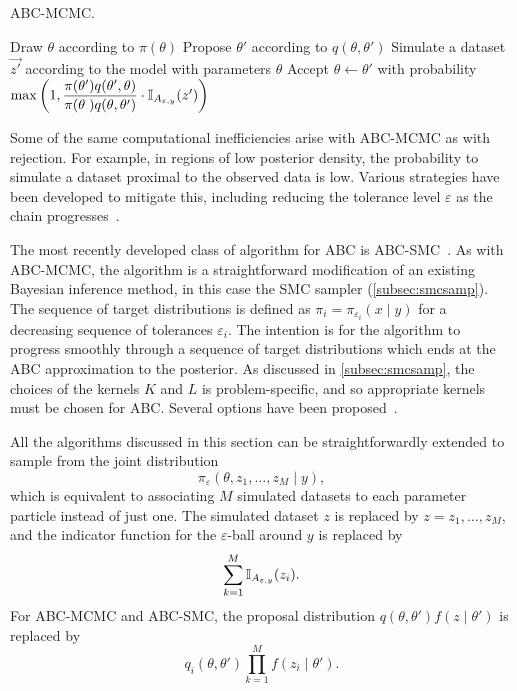 \begin{algorithm}
  \caption{\gls{ABC}-\gls{MCMC}.}
  \begin{algorithmic}
    \State Draw $\theta$ according to $\pi(\theta)$
    \Loop
      \State Propose $\theta'$ according to $q(\theta, \theta')$
      \State Simulate a dataset $\vec{z'}$ according to the model with
             parameters $\theta$
      \State Accept $\theta \gets \theta'$ with probability
      $\max \left( 1, 
       \dfrac{\pi(\theta') q(\theta', \theta)}
             {\pi(\theta\phantom{'}) q(\theta, \theta')} 
       \cdot \mathbb{I}_{A_{\varepsilon, y}}(z') \right)$
    \EndLoop
  \end{algorithmic}
  \label{alg:abcmcmc}
\end{algorithm}

Some of the same computational inefficiencies arise with \gls{ABC}-\gls{MCMC}
as with rejection. For example, in regions of low posterior density, the
probability to simulate a dataset proximal to the observed data is low. Various
strategies have been developed to mitigate this, including reducing the
tolerance level $\varepsilon$ as the chain
progresses~\autocite{ratmann2007using}.

The most recently developed class of algorithm for \gls{ABC} is
\gls{ABC}-\gls{SMC}~\autocite{sisson2007sequential, beaumont2009adaptive}. As
with \gls{ABC}-\gls{MCMC}, the algorithm is a straightforward modification of
an existing Bayesian inference method, in this case the \gls{SMC} sampler
(\cref{subsec:smcsamp}). The sequence of target distributions is defined as
$\pi_i = \pi_{\varepsilon_i}(x \mid y)$ for a decreasing sequence of tolerances
$\varepsilon_i$. The intention is for the algorithm to progress smoothly
through a sequence of target distributions which ends at the \gls{ABC}
approximation to the posterior. As discussed in \cref{subsec:smcsamp}, the
choices of the kernels $K$ and $L$ is problem-specific, and so appropriate
kernels must be chosen for \gls{ABC}. Several options have been
proposed~\autocite{beaumont2009adaptive, sisson2007sequential,
del2012adaptive}.

All the algorithms discussed in this section can be straightforwardly extended
to sample from the joint distribution
\[
  \pi_\varepsilon(\theta, z_1, \ldots, z_M \mid y),
\]
which is equivalent to associating $M$ simulated datasets to each parameter
particle instead of just one. The simulated dataset $z$ is replaced by
$z = z_1, \ldots, z_M$, and the indicator function for the
$\varepsilon$-ball around $y$ is replaced by
\[
  \sum_{k=1}^M \mathbb{I}_{A_{\varepsilon, y}} (z_i).
\]
For \gls{ABC}-\gls{MCMC} and \gls{ABC}-\gls{SMC}, the proposal distribution
$q(\theta, \theta') f(z \mid \theta')$ is replaced by
\[
  q_i(\theta, \theta') \prod_{k=1}^M f(z_i \mid \theta').
\]
